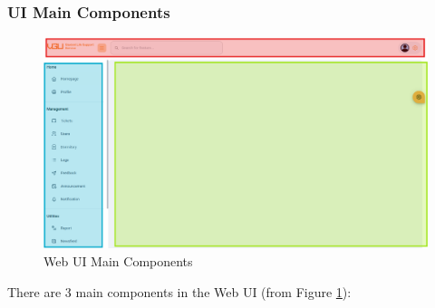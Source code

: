 	\subsubsection{UI Main Components}
	\begin{figure}[H]
		\centering
		\includegraphics[width=1\linewidth]{graphics/fe/fe-main-comp}
		\caption{Web UI Main Components}
		\label{fig:fe-main-comp}
	\end{figure}
	There are 3 main components in the Web UI (from Figure \ref{fig:fe-main-comp}):
	

